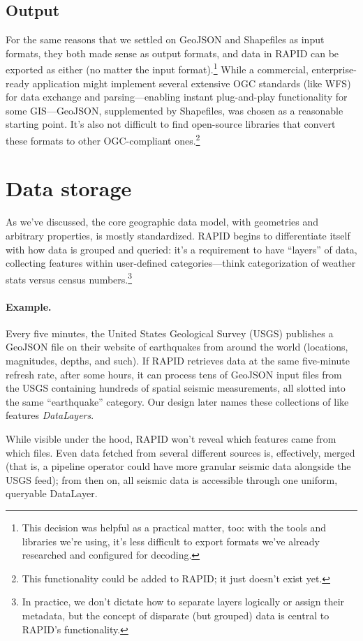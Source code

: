 \subsection{Output}
For the same reasons that we settled on GeoJSON and Shapefiles as input formats, they both made sense as output formats, and data in RAPID can be exported as either (no matter the input format).\footnote{This decision was helpful as a practical matter, too: with the tools and libraries we're using, it's less difficult to export formats we've already researched and configured for decoding.} While a commercial, enterprise-ready application might implement several extensive OGC standards (like WFS) for data exchange and parsing---enabling instant plug-and-play functionality for some GIS---GeoJSON, supplemented by Shapefiles, was chosen as a reasonable starting point. It's also not difficult to find open-source libraries that convert these formats to other OGC-compliant ones.\footnote{This functionality could be added to RAPID; it just doesn't exist yet.}


\section{Data storage}
\label{reqs_layers}
As we've discussed, the core geographic data model, with geometries and arbitrary properties, is mostly standardized. RAPID begins to differentiate itself with how data is grouped and queried: it's a requirement to have ``layers'' of data, collecting features within user-defined categories---think categorization of weather stats versus census numbers.\footnote{In practice, we don't dictate how to separate layers logically or assign their metadata, but the concept of disparate (but grouped) data is central to RAPID's functionality.}

\paragraph{Example.}
Every five minutes, the United States Geological Survey (USGS) publishes a GeoJSON file on their website of earthquakes from around the world (locations, magnitudes, depths, and such). If RAPID retrieves data at the same five-minute refresh rate, after some hours, it can process tens of GeoJSON input files from the USGS containing hundreds of spatial seismic measurements, all slotted into the same ``earthquake'' category. Our design later names these collections of like features \textit{DataLayers}.

While visible under the hood, RAPID won't reveal which features came from which files. Even data fetched from several different sources is, effectively, merged (that is, a pipeline operator could have more granular seismic data alongside the USGS feed); from then on, all seismic data is accessible through one uniform, queryable DataLayer.

